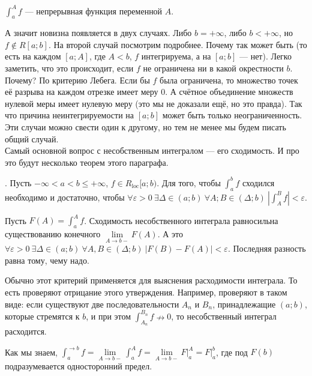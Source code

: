 \documentclass{article}
\begin{document}
\begin{itemize}
        \begin{Proof}
            $\int_a^A f$ --- непрерывная функция переменной $A$.
        \end{Proof}
        \begin{Comment}
            А значит новизна появляется в двух случаях. Либо $b=+\infty$, либо $b<+\infty$, но $f\notin R[a;b]$. На второй случай посмотрим подробнее. Почему так может быть (то есть на каждом $[a;A]$, где $A<b$, $f$ интегрируема, а на $[a;b]$ --- нет). Легко заметить, что это происходит, если $f$ не ограничена ни в какой окрестности $b$. Почему? По критерию Лебега. Если бы $f$ была ограничена, то множество точек её разрыва на каждом отрезке имеет меру 0. А счётное объединение множеств нулевой меры имеет нулевую меру (это мы не доказали ещё, но это правда). Так что причина неинтегрируемости на $[a;b]$ может быть только неограниченность. Эти случаи можно свести один к другому, но тем не менее мы будем писать общий случай.\\
            Самый основной вопрос с несобственным интегралом --- его сходимость. И про это будут несколько теорем этого параграфа.
        \end{Comment}
        \thm {}. Пусть $-\infty<a<b\leqslant+\infty$, $f\in R_{\mathrm{loc}}[a;b)$. Для того, чтобы $\int_a^bf$ сходился необходимо и достаточно, чтобы $\forall\varepsilon>0~\exists\Delta\in(a;b)~\forall A;B\in(\Delta;b)~\left|\int_A^Bf\right|<\varepsilon$.
        \begin{Proof}
            Пусть $F(A)=\int_a^Af$. Сходимость несобственного интеграла равносильна существованию конечного $\lim\limits_{A\to b-}F(A)$. А это $\forall\varepsilon>0~\exists\Delta\in(a;b)~\forall A,B\in(\Delta;b)~|F(B)-F(A)|<\varepsilon$. Последняя разность равна тому, чему надо.
        \end{Proof}
        \begin{Comment}
            Обычно этот критерий применяется для выяснения расходимости интеграла. То есть проверяют отрицание этого утверждения. Например, проверяют в таком виде: если существуют две последовательности $A_n$ и $B_n$, принадлежащие $(a;b)$, которые стремятся к $b$, и при этом $\int_{A_n}^{B_n}f\nrightarrow0$, то несобственный интеграл расходится.
        \end{Comment}
        \begin{Comment}
            Как мы знаем, $\int_a^{\to b}f=\lim\limits_{A\to b-}\int_a^Af=\lim\limits_{A\to b-}F\big|_a^A=F\big|_a^b$, где под $F(b)$ подразумевается односторонний предел.

\end{Comment}
\end{itemize}
\end{document}
